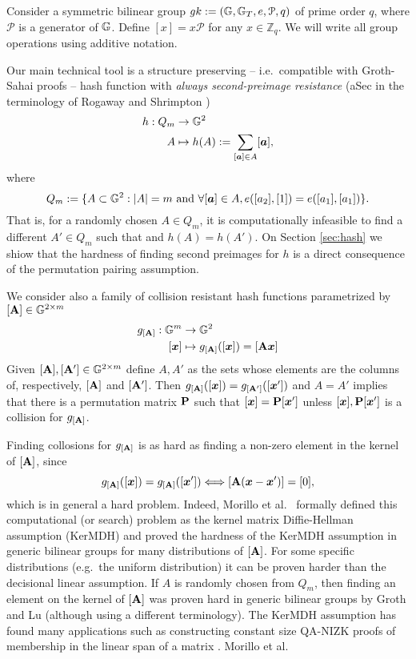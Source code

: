 Consider a symmetric bilinear group $gk:=(\mathbb{G},\mathbb{G}_T,e,\mathcal{P},q)$ of prime order $q$, where $\mathcal{P}$ is a generator of $\mathbb{G}$. Define $[x]=x\mathcal{P}$ for any $x\in\mathbb{Z}_q$.  We will write all group operations using additive notation.

Our main technical tool is a structure preserving -- i.e.~compatible with Groth-Sahai proofs -- hash function with \emph{always second-preimage resistance} (aSec in the terminology of Rogaway and Shrimpton \cite{FSE:RogShr04})
\begin{align*}
h : Q_m &\to \mathbb{G}^2\\
      A &\mapsto h(A) := \sum_{[{\boldsymbol{a}}]\in A} [{\boldsymbol{a}}],
\end{align*}
 where
$$
Q_m:= \{A\subset\mathbb{G}^2: |A|=m \text{ and }\forall [{\boldsymbol{a}}]\in A, e([a_2],[1])=e([a_1],[a_1])\}.
$$
That is, for a randomly chosen $A\in Q_m$, it is computationally infeasible to find a different $A'\in Q_m$ such that and $h(A)=h(A')$. On Section \ref{sec:hash} we shiow that the hardness of finding second preimages for $h$ is a direct consequence of the permutation pairing assumption.

We consider also a family of collision resistant hash functions parametrized by $[\mathbf{{A}}]\in\mathbb{G}^{2\times m}$
\begin{align*}
g_{[\matr{A}]} : \GG^m &\to \GG^2\\
           [\vecb{x}] &\mapsto g_{[\matr{A}]}([\vecb{x}]) = [\matr{A}\vecb{x}]
\end{align*}
Given $[\mathbf{{A}}],[\mathbf{{A}}']\in\mathbb{G}^{2\times m}$ define $A,A'$ as the sets whose elements are the columns of, respectively, $[\mathbf{{A}}]$ and $[\mathbf{{A}}']$. Then $g_{[\mathbf{{A}}]}([{\boldsymbol{x}}]) = g_{[\mathbf{{A}}']}([{\boldsymbol{x}}'])$ and $A=A'$ implies that there is a permutation matrix $\mathbf{{P}}$ such that $[{\boldsymbol{x}}]=\mathbf{{P}}[{\boldsymbol{x}}']$ unless $[{\boldsymbol{x}}],\mathbf{{P}}[{\boldsymbol{x}}']$ is a collision for $g_{[\mathbf{{A}}]}$.
 
 Finding collosions for $g_{[\mathbf{{A}}]}$ is as hard as finding a non-zero element in the kernel of $[\mathbf{{A}}]$, since
$$
g_{[\mathbf{{A}}]}([{\boldsymbol{x}}]) = g_{[\mathbf{{A}}]}([{\boldsymbol{x}}']) \Longleftrightarrow [\mathbf{{A}}({\boldsymbol{x}}-{\boldsymbol{x}}')]=[0],
$$
which is in general a hard problem. Indeed,
Morillo et al.~\cite{AC:MorRafVil16} formally defined this computational (or search) problem as the kernel matrix Diffie-Hellman assumption (KerMDH) and proved the hardness of the KerMDH assumption in generic bilinear groups for many distributions of $[\mathbf{{A}}]$. For some specific distributions (e.g.~the uniform distribution) it can be proven harder than the decisional linear assumption. If $A$ is randomly chosen from $Q_m$, then finding an element on the kernel of $[\mathbf{{A}}]$ was proven hard in generic bilinear groups by Groth and Lu \cite{AC:GroLu07} (although using a different terminology).
The KerMDH assumption has found many applications such as constructing constant size QA-NIZK proofs of membership in the linear span of a matrix \cite{EC:LPJY14,EC:KilWee15}. Morillo et al.

